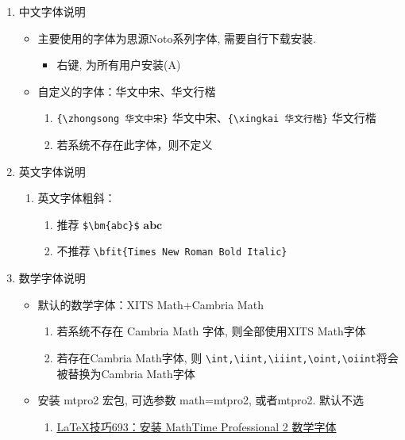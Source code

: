 \documentclass[11pt,twoside]{article} %
\begin{document}
\begin{enumerate}
\item 中文字体说明
\begin{itemize}
\item 主要使用的字体为思源Noto系列字体, 需要自行下载安装. 
\begin{itemize}
\item 右键, 为所有用户安装(A)
\end{itemize}
\item 自定义的字体：华文中宋、华文行楷
\begin{enumerate}
\item \lstinline[style=iltx]|{\zhongsong 华文中宋}| {\zhongsong 华文中宋}、\lstinline[style=iltx]|{\xingkai 华文行楷}| {\xingkai 华文行楷}
\item 若系统不存在此字体，则不定义
\end{enumerate}
\end{itemize}
\item 英文字体说明
\begin{enumerate}
\item 英文字体粗斜：
\begin{enumerate}
	\item 推荐 \lstinline[style=iltx]|$\bm{abc}$| \quad $\bm{abc}$
	\item 不推荐 \lstinline[style=iltx]|| \bfit{Times New Roman Bold Italic}
\end{enumerate}
\end{enumerate}
\item 数学字体说明
\begin{itemize}
\item 默认的数学字体：XITS Math+Cambria Math
\begin{enumerate}
\item 若系统不存在 Cambria Math 字体, 则全部使用XITS Math字体
\item 若存在Cambria Math字体, 则 \lstinline[style=iltx]|\int,\iint,\iiint,\oint,\oiint|将会被替换为Cambria Math字体
\end{enumerate}
\item 安装 mtpro2 宏包, 可选参数 math=mtpro2, 或者mtpro2. 默认不选
\begin{enumerate}
\item \href{http://www.latexstudio.net/archives/241.html}{LaTeX技巧693：安装 MathTime Professional 2 数学字体}
\end{enumerate}
\end{itemize}
\end{enumerate}
\end{document}

